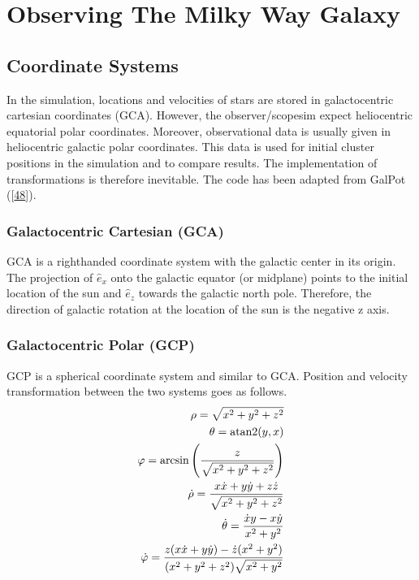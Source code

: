 \documentclass[letterpaper,10pt,english]{sphinxmanual}
\begin{document}
\part{Observing The Milky Way Galaxy}

\chapter{Coordinate Systems}
\label{\detokenize{NBodySimulation/CoordinateSystems:coordinate-systems}}\label{\detokenize{NBodySimulation/CoordinateSystems::doc}}
\sphinxAtStartPar
In the simulation, locations and velocities of stars are stored in galactocentric cartesian coordinates (GCA).
However, the observer/scopesim expect heliocentric equatorial polar coordinates.
Moreover, observational data is usually given in heliocentric galactic polar coordinates.
This data is used for initial cluster positions in the simulation and to compare results.
The implementation of transformations is therefore inevitable. The code has been adapted from GalPot ({[}\hyperlink{cite.NBodySimulation/Appendix:id23}{48}{]}).


\section{Galactocentric Cartesian (GCA)}
\label{\detokenize{NBodySimulation/CoordinateSystems:galactocentric-cartesian-gca}}
\sphinxAtStartPar
GCA is a right\sphinxhyphen{}handed coordinate system with the galactic center in its origin.
The projection of \(\hat{e}_x\) onto the galactic equator (or midplane) points to the initial location of the sun and
\(\hat{e}_z\) towards the galactic north pole. Therefore, the direction of galactic rotation at the location of the sun is the negative z axis.


\section{Galactocentric Polar (GCP)}
\label{\detokenize{NBodySimulation/CoordinateSystems:galactocentric-polar-gcp}}
\sphinxAtStartPar
GCP is a spherical coordinate system and similar to GCA.
Position and velocity transformation between the two systems goes as follows.
\begin{equation}\label{equation:NBodySimulation/CoordinateSystems:GCA_to_GCP}
\begin{split}\rho  = \sqrt{x^2+y^2+z^2} \\
\theta = \textup{atan2}{\left ( y,x \right )}\\
\varphi  = \arcsin\left ( \frac{z}{\sqrt{x^2+y^2+z^2}} \right ) \\
\dot{\rho} =  \frac{x\dot{x}+y\dot{y}+z\dot{z}}{\sqrt{x^2+y^2+z^2}}\\
\dot{\theta} = \frac{\dot{x}y-x\dot{y}}{x^2+y^2} \\
\dot{\varphi} = \frac{z(x\dot{x}+y\dot{y})-\dot{z}(x^2+y^2)}{(x^2+y^2+z^2)\sqrt{x^2+y^2}}\end{split}
\end{equation}
\end{document}
